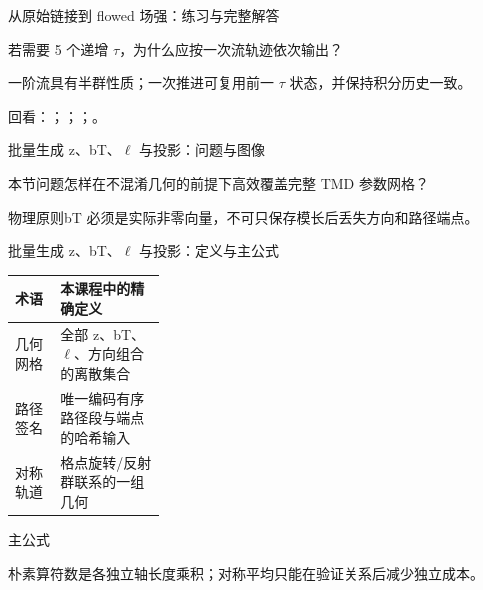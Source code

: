 \begin{frame}[t]{从原始链接到 flowed 场强：练习与完整解答}
\footnotesize
\begin{block}{}若需要 5 个递增 \ensuremath{\tau}，为什么应按一次流轨迹依次输出？\end{block}
\begin{exampleblock}{}一阶流具有半群性质；一次推进可复用前一 \ensuremath{\tau} 状态，并保持积分历史一致。\end{exampleblock}
\vfill
\scriptsize 回看：；；；。
\end{frame}

\begin{frame}[t]{批量生成 z、bT、\ensuremath{\ell} 与投影：问题与图像}
\footnotesize
\begin{block}{本节问题}怎样在不混淆几何的前提下高效覆盖完整 TMD 参数网格？\end{block}
\begin{block}{物理原则}\quad bT 必须是实际非零向量，不可只保存模长后丢失方向和路径端点。\end{block}
\end{frame}

\begin{frame}[t]{批量生成 z、bT、\ensuremath{\ell} 与投影：定义与主公式}
\footnotesize\begin{tabularx}{\linewidth}{p{0.30\linewidth}Y}
\toprule 术语 & 本课程中的精确定义\\\midrule
{} 几何网格 & 全部 z、bT、\ensuremath{\ell}、方向组合的离散集合\\
 路径签名 & 唯一编码有序路径段与端点的哈希输入\\
 对称轨道 & 格点旋转/\allowbreak{}反射群联系的一组几何\\
\bottomrule\end{tabularx}\vspace{0.15cm}
\begin{block}{ 主公式}\centering{}\end{block}
朴素算符数是各独立轴长度乘积；对称平均只能在验证关系后减少独立成本。
\end{frame}

